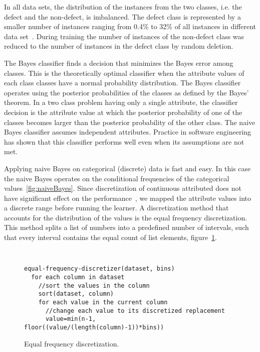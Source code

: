 \documentclass{sig-alternate}
\begin{document}
In all data sets, the distribution of the instances from the two classes, i.e. the defect and the non-defect, is
imbalanced. The defect class is represented by a smaller number of instances ranging  from 0.4\% to 32\% of
all instances in different data set~\cite{Turhan2009}. During training the number of instances of the non-defect
class was reduced to the number of instances in the defect class by random deletion.

The Bayes classifier finds a decision that minimizes the Bayes error among classes. This is the theoretically
optimal classifier when the attribute values of each class classes have a normal probability distribution. The
Bayes classifier operates using the posterior probabilities of the classes as defined by the Bayes' theorem. In a
two class problem having only a single attribute, the classifier decision is the attribute value at which the
posterior probability of one of the classes becomes larger than the posterior probability of the other class. The
naive Bayes classifier assumes independent attributes. Practice in software engineering has shown that this
classifier performs well even when its assumptions are not met.

Applying naive Bayes on categorical (discrete) data is fast and easy. In this case the naive Bayes operates on the
conditional frequencies of the categorical values~\ref{fig:naiveBayes}. Since discretization of continuous
attributed does not have significant effect on the performance~\cite{Dougherty95}, we mapped the attribute
values into a discrete range before running the learner. A discretization method that accounts for the distribution
of the values is the equal frequency discretization.  This method splits a list of numbers into a predefined
number of intervals, such that every interval contains the equal count of list elements,
figure~\ref{fig:discretization}.
\begin{figure}[tbp]
\makebox[\linewidth]{\hrulefill}
{\tt\small
\begin{verbatim}
equal-frequency-discretizer(dataset, bins)
  for each column in dataset
    //sort the values in the column
    sort(dataset, column)
    for each value in the current column
      //change each value to its discretized replacement
      value=min(n-1, floor((value/(length(column)-1))*bins))
\end{verbatim}}
\makebox[\linewidth]{\hrulefill}
\caption{Equal frequency discretization.}
\label{fig:discretization}
\end{figure}
\end{document}
